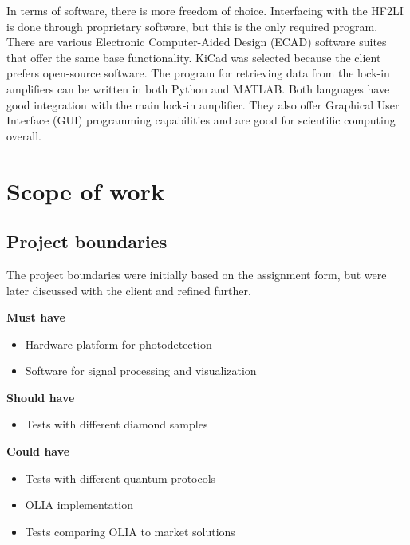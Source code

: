 In terms of software, there is more freedom of choice. Interfacing with the HF2LI is done through proprietary software, but this is the only required program. There are various Electronic Computer-Aided Design (ECAD) software suites that offer the same base functionality. KiCad was selected because the client prefers open-source software. The program for retrieving data from the lock-in amplifiers can be written in both Python and MATLAB. Both languages have good integration with the main lock-in amplifier. They also offer Graphical User Interface (GUI) programming capabilities and are good for scientific computing overall.



\section{Scope of work}

\subsection{Project boundaries}\label{project_boundaries}
The project boundaries were initially based on the assignment form, but were later discussed with the client and refined further. 

\textbf{Must have}
\begin{itemize}
	\item Hardware platform for photodetection
	\item Software for signal processing and visualization
\end{itemize}

\textbf{Should have}
\begin{itemize}
	\item Tests with different diamond samples
\end{itemize}

\textbf{Could have}
\begin{itemize}
	\item Tests with different quantum protocols
	\item OLIA implementation
	\item Tests comparing OLIA to market solutions
\end{itemize}

